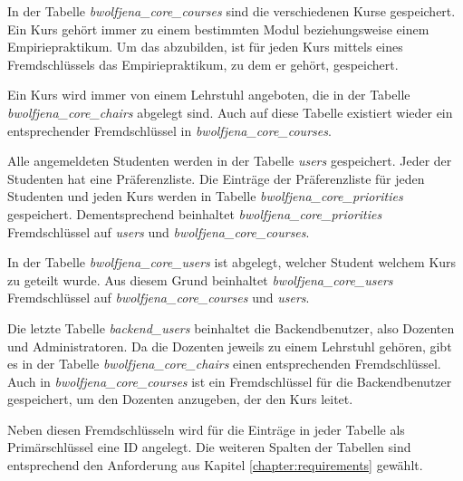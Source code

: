        In der Tabelle \textit{bwolfjena\_core\_courses} sind die verschiedenen Kurse gespeichert.
        Ein Kurs gehört immer zu einem bestimmten Modul beziehungsweise einem Empiriepraktikum.
        Um das abzubilden, ist für jeden Kurs mittels eines Fremdschlüssels das Empiriepraktikum, zu dem er gehört, gespeichert.
        
        Ein Kurs wird immer von einem Lehrstuhl angeboten, die in der Tabelle \textit{bwolfjena\_core\_chairs} abgelegt sind.
        Auch auf diese Tabelle existiert wieder ein entsprechender Fremdschlüssel in \textit{bwolfjena\_core\_courses}. 
        
        Alle angemeldeten Studenten werden in der Tabelle \textit{users} gespeichert.
        Jeder der Studenten hat eine Präferenzliste.
        Die Einträge der Präferenzliste für jeden Studenten und jeden Kurs werden in Tabelle \textit{bwolfjena\_core\_priorities} gespeichert.
        Dementsprechend beinhaltet \textit{bwolfjena\_core\_priorities} Fremdschlüssel auf \textit{users} und \textit{bwolfjena\_core\_courses}.
        
        In der Tabelle \textit{bwolfjena\_core\_users} ist abgelegt, welcher Student welchem Kurs zu geteilt wurde.
        Aus diesem Grund beinhaltet \textit{bwolfjena\_core\_users} Fremdschlüssel auf \textit{bwolfjena\_core\_courses} und \textit{users}. 
        
        Die letzte Tabelle \textit{backend\_users} beinhaltet die Backendbenutzer, also Dozenten und Administratoren.
        Da die Dozenten jeweils zu einem Lehrstuhl gehören, gibt es in der Tabelle \textit{bwolfjena\_core\_chairs} einen entsprechenden Fremdschlüssel.
        Auch in \textit{bwolfjena\_core\_courses} ist ein Fremdschlüssel für die Backendbenutzer gespeichert, um den Dozenten anzugeben, der den Kurs leitet.
        
        Neben diesen Fremdschlüsseln wird für die Einträge in jeder Tabelle als Primärschlüssel eine ID angelegt.
        Die weiteren Spalten der Tabellen sind entsprechend den Anforderung aus Kapitel \ref{chapter:requirements} gewählt.
        
        
        
    
